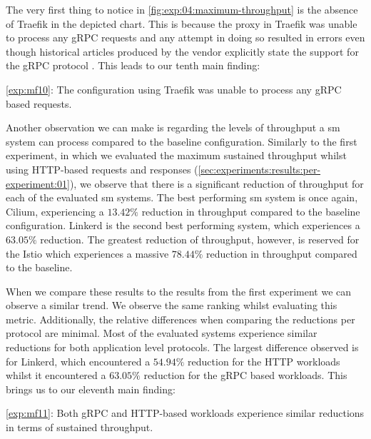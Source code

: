The very first thing to notice in \cref{fig:exp:04:maximum-throughput} is the absence of Traefik in the depicted chart. This is because the proxy in Traefik was unable to process any gRPC requests and any attempt in doing so resulted in errors even though historical articles produced by the vendor explicitly state the support for the gRPC protocol \cite{maesh-introduction}. This leads to our tenth main finding:

\begin{shaded*}
    \noindent
    \ref{exp:mf10}:
    The configuration using Traefik was unable to process any gRPC based requests.
\end{shaded*}


Another observation we can make is regarding the levels of throughput a \gls{sm} system can process compared to the baseline configuration. Similarly to the first experiment, in which we evaluated the maximum sustained throughput whilst using HTTP-based requests and responses (\cref{sec:experiments:results:per-experiment:01}), we observe that there is a significant reduction of throughput for each of the evaluated \gls{sm} systems. The best performing \gls{sm} system is once again, Cilium, experiencing a $13.42\%$ reduction in throughput compared to the baseline configuration. Linkerd is the second best performing system, which experiences a $63.05\%$ reduction. The greatest reduction of throughput, however, is reserved for the Istio which experiences a massive $78.44\%$ reduction in throughput compared to the baseline.

When we compare these results to the results from the first experiment we can observe a similar trend. We observe the same ranking whilst evaluating this metric. Additionally, the relative differences when comparing the reductions per protocol are minimal. Most of the evaluated systems experience similar reductions for both application level protocols. The largest difference observed is for Linkerd, which encountered a $54.94\%$ reduction for the HTTP workloads whilst it encountered a $63.05\%$ reduction for the gRPC based workloads. This brings us to our eleventh main finding:

\begin{shaded*}
    \noindent
    \ref{exp:mf11}:
    Both gRPC and HTTP-based workloads experience similar reductions in terms of sustained throughput.
\end{shaded*}


